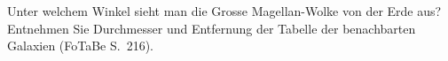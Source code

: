 Unter welchem Winkel sieht man die Grosse Magellan-Wolke von der Erde aus? Entnehmen Sie Durchmesser und Entfernung der Tabelle der benachbarten Galaxien (FoTaBe S.~216).

